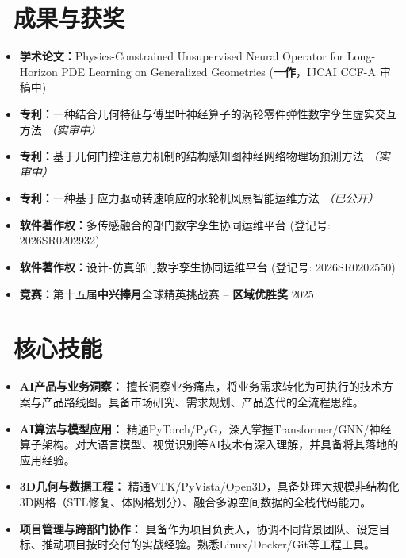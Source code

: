 \documentclass[11pt]{article}
\begin{document}
\section{%
    \makebox[\widthof{\faTrophy}][c]%
    {\color{CVBlue}\faTrophy}\ 成果与获奖%
}

\begin{itemize}
    \item \textbf{学术论文：}Physics-Constrained Unsupervised Neural Operator for Long-Horizon PDE Learning on Generalized Geometries (\textbf{一作}，IJCAI CCF-A 审稿中)
    \item \textbf{专利：}一种结合几何特征与傅里叶神经算子的涡轮零件弹性数字孪生虚实交互方法 \textit{（实审中）}
    \item \textbf{专利：}基于几何门控注意力机制的结构感知图神经网络物理场预测方法 \textit{（实审中）}
    \item \textbf{专利：}一种基于应力驱动转速响应的水轮机风扇智能运维方法 \textit{（已公开）}
    \item \textbf{软件著作权：}多传感融合的部门数字孪生协同运维平台 (登记号: 2026SR0202932)
    \item \textbf{软件著作权：}设计-仿真部门数字孪生协同运维平台 (登记号: 2026SR0202550)
    \item \textbf{竞赛：}第十五届\textbf{中兴捧月}全球精英挑战赛 -- \textbf{区域优胜奖} \hfill 2025
\end{itemize}

  
\section{\makebox[\widthof{\faCogs}][c]{\color{CVBlue}\faCogs}\ 核心技能}
\begin{itemize}
    \item \textbf{AI产品与业务洞察：} 擅长洞察业务痛点，将业务需求转化为可执行的技术方案与产品路线图。具备市场研究、需求规划、产品迭代的全流程思维。
    \item \textbf{AI算法与模型应用：} 精通PyTorch/PyG，深入掌握Transformer/GNN/神经算子架构。对大语言模型、视觉识别等AI技术有深入理解，并具备将其落地的应用经验。
    \item \textbf{3D几何与数据工程：} 精通VTK/PyVista/Open3D，具备处理大规模非结构化3D网格（STL修复、体网格划分）、融合多源空间数据的全栈代码能力。
    \item \textbf{项目管理与跨部门协作：} 具备作为项目负责人，协调不同背景团队、设定目标、推动项目按时交付的实战经验。熟悉Linux/Docker/Git等工程工具。
\end{itemize}
\end{document}
